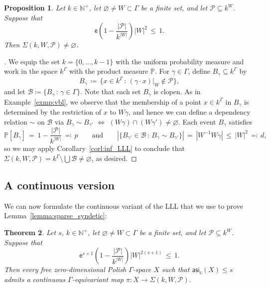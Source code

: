 \documentclass[11pt,reqno,psamsfonts]{amsart}
\theoremstyle{bfnote}
\newtheorem{theo}{Theorem}[section]
\newtheorem{prop}[theo]{Proposition}
\theoremstyle{definition}
\theoremstyle{remark}
\newcommand{\0}{\varnothing}
\newcommand{\set}[1]{\{#1\}}
\renewcommand{\P}{\mathbb{P}}
\renewcommand{\leq}{\leqslant}
\newcommand{\defeq}{\coloneqq}
\newcommand{\acts}{\mathrel{\reflectbox{$\righttoleftarrow$}}}
\newcommand{\G}{\Gamma}
\newcommand{\rest}[2]{{{#1}\vert_{#2}}}
\newcommand{\N}{\mathbb{N}}
\newcommand{\asi}{\mathsf{asi}}
\newcommand{\casi}{\asi_{\mathsf{c}}}
\numberwithin{equation}{section}
\newenvironment{scproof}[1][]{\begin{proof}[\textsc{\upshape{Proof}}#1]}{\end{proof}}
\begin{document}
    \begin{prop}\label{prop:SFT}
       Let $k \in \N^+$, let $\0\neq W \subset \G$ be a finite set, and let $\mathcal{P} \subseteq k^W$. Suppose that
       \[
            \mathsf{e} \left(1 - \frac{|\mathcal{P}|}{k^{|W|}}\right) |W|^2 \,\leq\, 1.
       \]
       Then $\Sigma(k, W, \mathcal{P}) \neq \0$.
    \end{prop}
    \begin{scproof}
        We equip the set $k = \set{0,\ldots, k-1}$ with the uniform probability measure and work in the space $k^\G$ with the product measure $\P$. For $\gamma \in \G$, define $B_\gamma \subseteq k^\G$ by
        \[
            B_\gamma \,\defeq\, \big\{x \in k^\G \,:\, \rest{(\gamma \cdot x)}{W} \notin \mathcal{P}\big\},
        \]
        and let $\mathcal{B} \defeq \set{B_\gamma \,:\, \gamma \in \G}$. Note that each set $B_\gamma$ is clopen.  %
        As in Example~\ref{exmp:vbl}, we observe that the membership of a point $x \in k^\G$ in $B_\gamma$ is determined by the restriction of $x$ to $W\gamma$, and hence we can define a dependency relation $\sim$ on $\mathcal{B}$ via %
        $B_\gamma \sim B_{\gamma'}$ $\Longleftrightarrow$ %
        $(W\gamma) \cap (W\gamma') \neq \0$. Each event $B_\gamma$ satisfies
        \[
            \P[B_\gamma] \,=\, 1 - \frac{|\mathcal{P}|}{k^{|W|}} \,\eqqcolon\, p \qquad \text{and} \qquad |\set{B_{\gamma'} \in \mathcal{B} \,:\, B_\gamma \sim B_{\gamma'}}| \,=\, |W^{-1}W\gamma| \,\leq\, |W|^2 \,\eqqcolon\, d,
        \]
        so we may apply Corollary~\ref{corl:inf_LLL} to conclude that $\Sigma(k, W, \mathcal{P}) = k^\G \setminus \bigcup \mathcal{B} \neq \0$, as desired.
    \end{scproof}

    \subsection{A continuous version}\label{subsec:CLLL}

    We can now formulate the continuous variant of the LLL that we use to prove Lemma~\ref{lemma:sparse_syndetic}:

    \begin{tcolorbox}
    \begin{theo}\label{theo:cont_LLL}
        Let $s$, $k \in \N^+$, let $\0\neq W \subset \G$ be a finite set, and let $\mathcal{P} \subseteq k^W$. Suppose that
       \begin{equation}\label{eq:cont_LLL}
            \mathsf{e}^{s+1} \left(1 - \frac{|\mathcal{P}|}{k^{|W|}}\right) |W|^{2(s+1)} \,\leq\, 1.
       \end{equation}
       Then every free zero-dimensional Polish $\G$-space $X$ %
       such that $\casi(X) \leq s$ admits a continuous $\G$-equivariant map $\pi \colon X \to \Sigma(k, W, \mathcal{P})$.
    \end{theo}
    \end{tcolorbox}
\end{document}
